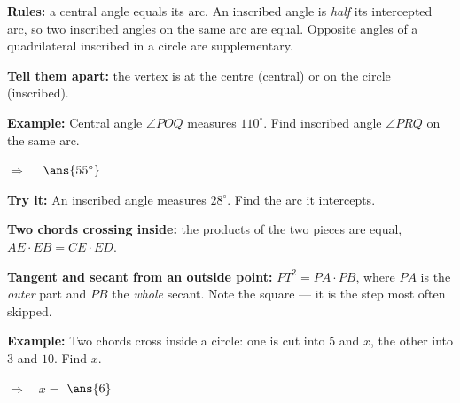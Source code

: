 \documentclass[12pt]{article}
\begin{document}


\begin{formulabox}
\textbf{Rules:} a central angle equals its arc. An inscribed angle is \emph{half} its intercepted arc, so two inscribed angles on the same arc are equal. Opposite angles of a quadrilateral inscribed in a circle are supplementary.\par
\textbf{Tell them apart:} the vertex is at the centre (central) or on the circle (inscribed).
\end{formulabox}

\begin{examplebox}
\textbf{Example:} \quad Central angle $\angle POQ$ measures $110^\circ$. Find inscribed angle $\angle PRQ$ on the same arc.

$\Rightarrow\quad$ $\ans{55^\circ}$
\end{examplebox}

\begin{tryitbox}
\textbf{Try it:} \quad An inscribed angle measures $28^\circ$. Find the arc it intercepts.\\[2pt]
\end{tryitbox}


\begin{formulabox}
\textbf{Two chords crossing inside:} the products of the two pieces are equal, $AE \cdot EB = CE \cdot ED$.\par
\textbf{Tangent and secant from an outside point:} $PT^2 = PA \cdot PB$, where $PA$ is the \emph{outer} part and $PB$ the \emph{whole} secant. Note the square --- it is the step most often skipped.
\end{formulabox}

\begin{examplebox}
\textbf{Example:} \quad Two chords cross inside a circle: one is cut into $5$ and $x$, the other into $3$ and $10$. Find $x$.

$\Rightarrow\quad x = $ $\ans{6}$
\end{examplebox}
\end{document}
